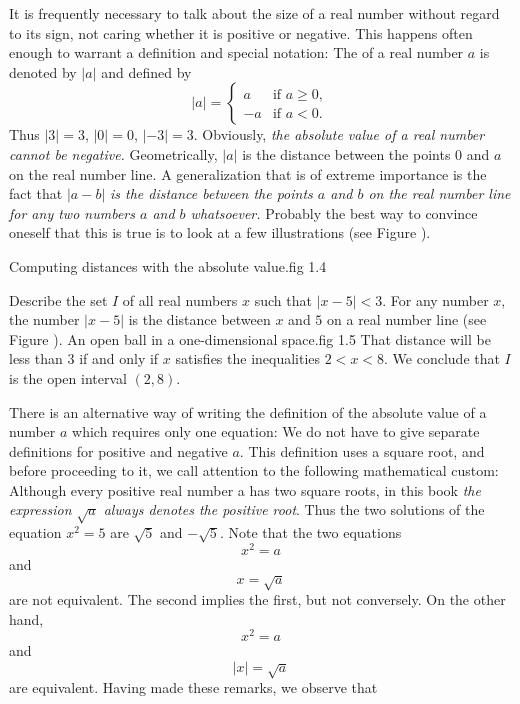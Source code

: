 It is frequently necessary to talk about the size of a real number
without regard to its sign, not caring whether it is positive or negative.
This happens often enough to warrant a definition and special notation:
The  of a real number $a$ is denoted by $|a|$
and defined by
\[
|a| = \left \{  \begin{array}{rl}
a    & \mbox{if $a \geq 0$}, \\
-a   & \mbox{if $a < 0$}.
                    \end{array}
\right. 
\]
Thus $|3| = 3$, $|0| = 0$, $|- 3| = 3$.
Obviously,
\emph{the absolute value of a real number cannot be negative.}
Geometrically,
$|a|$ is the distance between the points $0$ and $a$
on the real number line.
A generalization that is of extreme importance is the fact that $|a - b|$
\emph{is the distance between the
points $a$ and $b$ on the real number line for any two numbers
$a$ and $b$ whatsoever.}
Probably the best way to convince oneself that this is true
is to look at a few illustrations (see Figure ).

{Computing distances with the absolute value.}{fig 1.4}

\begin{example}
\label{exam 1.1.2}
Describe the set $I$ of all real numbers $x$
such that $|x - 5| < 3$.
For any number $x$,
the number $|x - 5|$ is the distance between $x$ and $5$
on a real number line (see Figure ).
 {An open ball in a one-dimensional space.}{fig 1.5}
That distance will be less than $3$
if and only if $x$ satisfies the inequalities $2 < x < 8$.
We conclude that $I$ is the open interval $(2, 8)$.
\end{example}


There is an alternative way of writing the definition
of the absolute value of a number $a$
which requires only one equation:
We do not have to give separate definitions for positive and negative $a$.
This definition uses a square root,
and before proceeding to it,
we call attention to the following mathematical custom:
Although every positive real number a has two square roots,
in this book
\emph{the expression $\sqrt a$ always denotes the positive root}.
Thus the two solutions of the equation $x^2 = 5$ are
$\sqrt 5$ and $-\sqrt 5$.
Note that the two equations
\[
x^2 = a
\]
and
\[
x = \sqrt a 
\]
are not equivalent.
The second implies the first, but not conversely.
On the other hand,
\[
x^2 = a
\]
and
\[
|x| = \sqrt a 
\]
are equivalent.
Having made these remarks, we observe that

